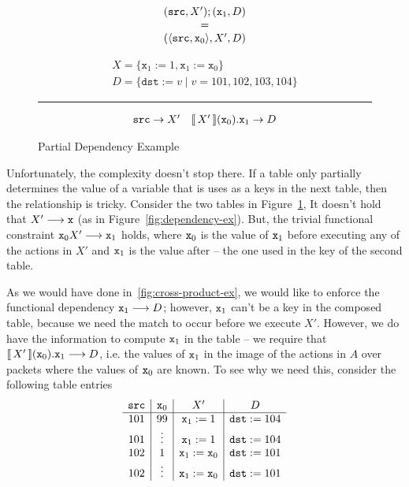 \begin{figure}
  \begin{minipage}{0.33\columnwidth}
  \[\begin{array}c
      (\texttt{src}, X');(\texttt{x}_1,D)
      \\ = \\
      (\langle\texttt{src},\texttt{x}_0\rangle, X', D)
    \end{array}
  \]
\end{minipage}\hfill \vline \hfill\begin{minipage}{0.66\columnwidth}
  \[\begin{array}{l}
      X = \{\texttt{x}_1:=1, \texttt{x}_1:=\texttt{x}_0\}\\
      D = \{\texttt{dst} := v \mid v = 101,102,103,104\}
    \end{array}
  \]
  \hrule\[\begin{array}{cc}
      \texttt{src} \to X'
      & \llbracket\,X'\,\rrbracket(\texttt{x}_0).\texttt{x}_1 \to D
    \end{array}\]
\end{minipage}
  \caption{Partial Dependency Example}
  \label{fig:partial-depend-ex}      
\end{figure}

Unfortunately, the complexity doesn't stop there. If a table only
partially determines the value of a variable that is uses as a keys in
the next table, then the relationship is tricky. Consider the two
tables in Figure~\ref{fig:partial-depend-ex}, It doesn't hold that
$X' \longrightarrow \texttt{x}$ (as in
Figure~\ref{fig:dependency-ex}). But, the trivial functional
constraint $\texttt{x}_0X' \longrightarrow \texttt{x}_1$
holds, where $\texttt{x}_0$ is the value of $\texttt{x}_1$ before
executing any of the actions in $X'$ and $\texttt{x}_1$ is the value
after -- the one used in the key of the second table.

As we would have done in~\ref{fig:cross-product-ex}, we would like to
enforce the functional dependency $\texttt{x}_1 \longrightarrow D$;
however, $\texttt{x}_1$ can't be a key in the composed table, because we need
the match to occur before we execute $X'$. However, we do have the
information to compute $\texttt{x}_1$ in the table -- we require that
$\llbracket\,X'\,\rrbracket(\texttt{x}_0).\texttt{x}_1\longrightarrow D$, i.e. the
values of $\texttt{x}_1$ in the image of the actions in $A$ over
packets where the values of $\texttt{x}_0$ are known. To see why we
need this, consider the following table entries
\[
  \begin{array}{c|c|c|c}
    \texttt{src} & \texttt{x}_0 & X' & D\\ \hline
    101 & 99 & \texttt{x}_1 := 1 & \texttt{dst} := 104 \\
    101 & \vdots & \texttt{x}_1 := 1 & \texttt{dst} := 104 \\
    102 & 1 & \texttt{x}_1 := \texttt{x}_0 & \texttt{dst} := 101 \\
    102 & \vdots & \texttt{x}_1 := \texttt{x}_0 & \texttt{dst} := 101 \\
  \end{array}
\]

